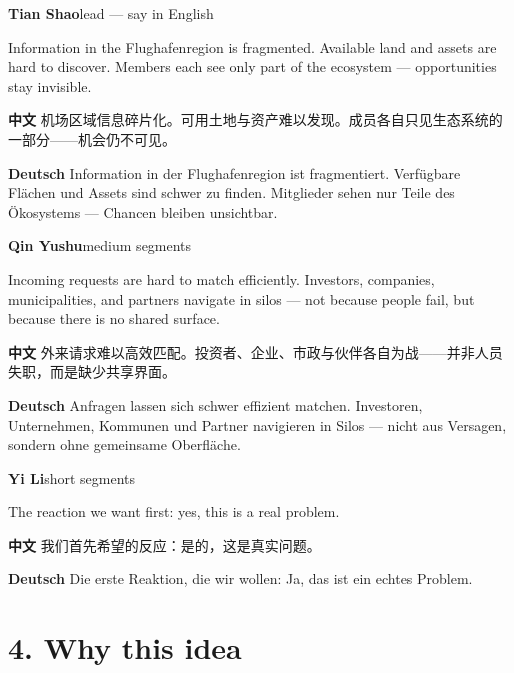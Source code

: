 \documentclass[11pt,a4paper]{ctexart}
\newenvironment{speakerblock}[2]{%
  \par\medskip
  {\color{berblue}\textbf{#1}}\hfill{\small\textcolor{bergrey}{#2}}\par
  \vspace{0.25em}
}{\par\medskip}
\begin{document}
\begin{speakerblock}{Tian Shao}{lead — say in English}
\begin{englishbox}
Information in the Flughafenregion is fragmented. Available land and assets are hard to discover. Members each see only part of the ecosystem — opportunities stay invisible.
\end{englishbox}

\textbf{中文} 机场区域信息碎片化。可用土地与资产难以发现。成员各自只见生态系统的一部分——机会仍不可见。

\textbf{Deutsch} Information in der Flughafenregion ist fragmentiert. Verfügbare Flächen und Assets sind schwer zu finden. Mitglieder sehen nur Teile des Ökosystems — Chancen bleiben unsichtbar.
\end{speakerblock}


\begin{speakerblock}{Qin Yushu}{medium segments}
\begin{englishbox}
Incoming requests are hard to match efficiently. Investors, companies, municipalities, and partners navigate in silos — not because people fail, but because there is no shared surface.
\end{englishbox}

\textbf{中文} 外来请求难以高效匹配。投资者、企业、市政与伙伴各自为战——并非人员失职，而是缺少共享界面。

\textbf{Deutsch} Anfragen lassen sich schwer effizient matchen. Investoren, Unternehmen, Kommunen und Partner navigieren in Silos — nicht aus Versagen, sondern ohne gemeinsame Oberfläche.
\end{speakerblock}


\begin{speakerblock}{Yi Li}{short segments}
\begin{englishbox}
The reaction we want first: yes, this is a real problem.
\end{englishbox}

\textbf{中文} 我们首先希望的反应：是的，这是真实问题。

\textbf{Deutsch} Die erste Reaktion, die wir wollen: Ja, das ist ein echtes Problem.
\end{speakerblock}



\section{4. Why this idea}
\end{document}
